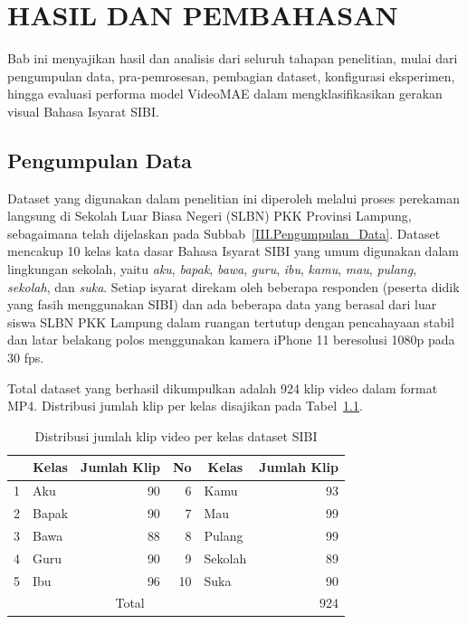 ﻿\newpage
\chapter{HASIL DAN PEMBAHASAN} \label{BabIV}

Bab ini menyajikan hasil dan analisis dari seluruh tahapan penelitian, mulai dari pengumpulan data, pra-pemrosesan, pembagian dataset, konfigurasi eksperimen, hingga evaluasi performa model VideoMAE dalam mengklasifikasikan gerakan visual Bahasa Isyarat SIBI.\par

\section{Pengumpulan Data} \label{IV.Pengumpulan}

Dataset yang digunakan dalam penelitian ini diperoleh melalui proses perekaman langsung di Sekolah Luar Biasa Negeri (SLBN) PKK Provinsi Lampung, sebagaimana telah dijelaskan pada Subbab~\ref{III.Pengumpulan_Data}. Dataset mencakup 10 kelas kata dasar Bahasa Isyarat SIBI yang umum digunakan dalam lingkungan sekolah, yaitu \textit{aku}, \textit{bapak}, \textit{bawa}, \textit{guru}, \textit{ibu}, \textit{kamu}, \textit{mau}, \textit{pulang}, \textit{sekolah}, dan \textit{suka}. Setiap isyarat direkam oleh beberapa responden (peserta didik yang fasih menggunakan SIBI) dan ada beberapa data yang berasal dari luar siswa SLBN PKK Lampung dalam ruangan tertutup dengan pencahayaan stabil dan latar belakang polos menggunakan kamera iPhone 11 beresolusi 1080p pada 30 fps.\par

Total dataset yang berhasil dikumpulkan adalah 924 klip video dalam format MP4. Distribusi jumlah klip per kelas disajikan pada Tabel~\ref{tab:4.distribusi_kelas}.\par

\begin{table}[H]
\centering
\caption{Distribusi jumlah klip video per kelas dataset SIBI}
\label{tab:4.distribusi_kelas}
{\setlength{\tabcolsep}{3pt}
\footnotesize
\begin{tabular}{|r|l|r||r|l|r|}
\hline
\rowcolor{gray!15} \multicolumn{1}{|c|}{No} & \multicolumn{1}{c|}{Kelas} & \multicolumn{1}{c|}{Jumlah Klip} & \multicolumn{1}{c|}{No} & \multicolumn{1}{c|}{Kelas} & \multicolumn{1}{c|}{Jumlah Klip} \\
\hline
1  & Aku     & 90  & 6  & Kamu    & 93 \\
\hline
2  & Bapak   & 90  & 7  & Mau     & 99 \\
\hline
3  & Bawa    & 88  & 8  & Pulang  & 99 \\
\hline
4  & Guru    & 90  & 9  & Sekolah & 89 \\
\hline
5  & Ibu     & 96  & 10 & Suka    & 90 \\
\hline
\multicolumn{5}{|c|}{Total} & 924 \\
\hline
\end{tabular}
}
\end{table}


